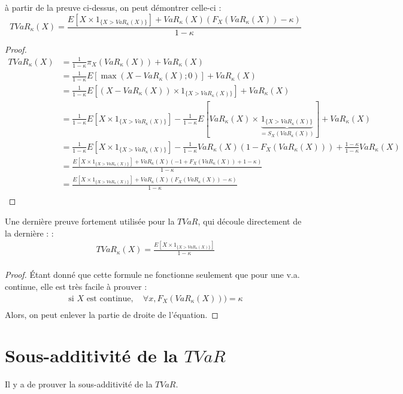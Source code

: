 à partir de la preuve ci-dessus, on peut démontrer celle-ci : 
$$
TVaR_\kappa(X) = \frac{E[X \times 1_{\{X > VaR_\kappa(X) \}}] + VaR_\kappa(X)(F_X(VaR_\kappa(X)) - \kappa)}{1-\kappa} 
$$

\begin{proof}
\begin{align*}
TVaR_\kappa(X)  & = \frac{1}{1 - \kappa} \pi_X(VaR_\kappa(X)) + VaR_\kappa(X) \\
    & = \frac{1}{1 - \kappa} E[\max(X - VaR_\kappa(X); 0)] + VaR_\kappa(X) \\
    & = \frac{1}{1 - \kappa} E[(X - VaR_\kappa(X)) \times 1_{\{X > VaR_\kappa(X) \}}] + VaR_\kappa(X) \\
    & = \frac{1}{1 - \kappa} E[X \times 1_{\{X > VaR_\kappa(X) \}}] - \frac{1}{1 - \kappa} E[VaR_\kappa(X) \times \underbrace{1_{\{X > VaR_\kappa(X) \}}}_{= S_X(VaR_\kappa(X))}] + VaR_\kappa(X) \\
    & = \frac{1}{1 - \kappa} E[X \times 1_{\{X > VaR_\kappa(X) \}}] - \frac{1}{1 - \kappa} VaR_\kappa(X)(1 - F_X(VaR_\kappa(X))) + \frac{1 - \kappa}{1 - \kappa}VaR_\kappa(X) \\
    & = \frac{E[X \times 1_{\{X > VaR_\kappa(X) \}}] + VaR_\kappa(X)(-1 + F_X(VaR_\kappa(X)) + 1 - \kappa)}{1 - \kappa}  \\
    & = \frac{E[X \times 1_{\{X > VaR_\kappa(X) \}}] + VaR_\kappa(X)(F_X(VaR_\kappa(X)) - \kappa)}{1 - \kappa}  \\
\end{align*}
\end{proof}

Une dernière preuve fortement utilisée pour la $TVaR$, qui découle directement de la dernière :  : 
\begin{align*}
TVaR_\kappa(X) = \frac{E[X \times 1_{\{X > VaR_\kappa(X) \}}]}{1 - \kappa}  \\
\end{align*}


\begin{proof}
Étant donné que cette formule ne fonctionne seulement que pour une v.a. continue, elle est très facile à prouver : 
\begin{align*}
\text{si $X$ est continue}, \quad \forall x, F_X(VaR_\kappa(X))) = \kappa \\
\end{align*}
Alors, on peut enlever la partie de droite de l'équation.
\end{proof}

\section{Sous-additivité de la $TVaR$}
\label{preuve:subadditivity_tvar}
Il y a  de prouver la sous-additivité de la $TVaR$.

